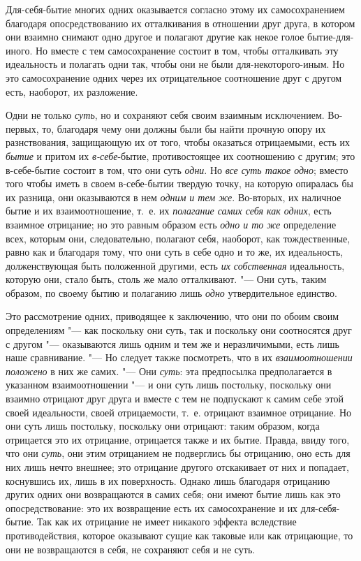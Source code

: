 Для-себя-бытие многих одних оказывается согласно этому их самосохранением
благодаря опосредствованию их отталкивания в отношении друг друга, в
котором они взаимно снимают одно другое и полагают другие как некое голое
бытие-для-иного. Но вместе с тем самосохранение состоит в том,
чтобы отталкивать эту идеальность и полагать одни так, чтобы они не были
для-некоторого-иным. Но это самосохранение одних через их отрицательное
соотношение друг с другом есть, наоборот, их разложение.

Одни не только {\em суть}, но и сохраняют себя своим
взаимным исключением. Во-первых, то, благодаря чему они должны были бы
найти прочную опору их разнствования, защищающую их от того, чтобы
оказаться отрицаемыми, есть их {\em бытие} и притом их
{\em в-себе}-бытие, противостоящее их соотношению с
другим; это в-себе-бытие состоит в том, что они суть
{\em одни}. Но {\em все суть такое
одно}; вместо того чтобы иметь в своем в-себе-бытии твердую точку, на
которую опиралась бы их разница, они оказываются в нем
{\em одним и тем же}. Во-вторых, их наличное бытие и их
взаимоотношение, т.~е. их {\em полагание самих себя как
одних}, есть взаимное отрицание; но это равным образом есть
{\em одно и то же} определение всех, которым они,
следовательно, полагают себя, наоборот, как тождественные, равно как и
благодаря тому, что они суть в себе одно и то же, их идеальность,
долженствующая быть положенной другими, есть {\em их
собственная} идеальность, которую они, стало быть, столь же мало
отталкивают. "--- Они суть, таким образом, по своему бытию и полаганию лишь
{\em одно} утвердительное единство.

Это рассмотрение одних, приводящее к заключению, что они по обоим своим
определениям "--- как поскольку они суть, так и поскольку они соотносятся друг
с другом "--- оказываются лишь одним и тем же и неразличимыми, есть лишь наше
сравнивание. "--- Но следует также посмотреть, что в их
{\em взаимоотношении положено} в них же самих. "--- Они
{\em суть}: эта предпосылка предполагается в указанном
взаимоотношении "--- и они суть лишь постольку, поскольку они взаимно отрицают
друг друга и вместе с тем не подпускают к самим себе этой своей
идеальности, своей отрицаемости, т.~е. отрицают взаимное отрицание. Но они
суть лишь постольку, поскольку они отрицают: таким образом, когда
отрицается это их отрицание, отрицается также и их бытие. Правда, ввиду
того, что они {\em суть}, они этим отрицанием не
подверглись бы отрицанию, оно есть для них лишь нечто внешнее; это
отрицание другого отскакивает от них и попадает, коснувшись их, лишь в их
поверхность. Однако лишь благодаря отрицанию других одних они возвращаются
в самих себя; они имеют бытие лишь как это опосредствование: это их
возвращение есть их самосохранение и их для-себя-бытие. Так как их
отрицание не имеет никакого эффекта вследствие противодействия, которое
оказывают сущие как таковые или как отрицающие, то они не возвращаются в
себя, не сохраняют себя и не суть.

